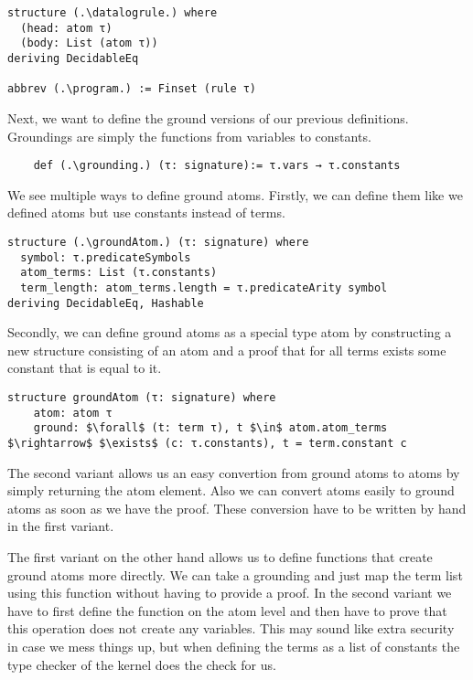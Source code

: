 \begin{lstlisting}
structure (.\datalogrule.) where
  (head: atom τ)
  (body: List (atom τ))
deriving DecidableEq

abbrev (.\program.) := Finset (rule τ)
\end{lstlisting}

Next, we want to define the ground versions of our previous definitions. Groundings are simply the functions from variables to constants.

\begin{lstlisting}
    def (.\grounding.) (τ: signature):= τ.vars → τ.constants
\end{lstlisting}

We see multiple ways to define ground atoms. Firstly, we can define them like we defined atoms but use constants instead of terms. 

\begin{lstlisting}
structure (.\groundAtom.) (τ: signature) where
  symbol: τ.predicateSymbols
  atom_terms: List (τ.constants)
  term_length: atom_terms.length = τ.predicateArity symbol
deriving DecidableEq, Hashable
\end{lstlisting}

Secondly, we can define ground atoms as a special type atom by constructing a new structure consisting of an atom and a proof that for all terms exists some constant that is equal to it.

\begin{lstlisting}
structure groundAtom (τ: signature) where
    atom: atom τ
    ground: $\forall$ (t: term τ), t $\in$ atom.atom_terms $\rightarrow$ $\exists$ (c: τ.constants), t = term.constant c
\end{lstlisting}

The second variant allows us an easy convertion from ground atoms to atoms by simply returning the atom element. Also we can convert atoms easily to ground atoms as soon as we have the proof. These conversion have to be written by hand in the first variant.

The first variant on the other hand allows us to define functions that create ground atoms more directly. We can take a grounding and just map the term list using this function without having to provide a proof. In the second variant we have to first define the function on the atom level and then have to prove that this operation does not create any variables. This may sound like extra security in case we mess things up, but when defining the terms as a list of constants the type checker of the kernel does the check for us.

